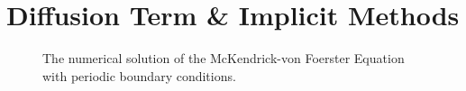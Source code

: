 \documentclass[../main.tex]{subfiles}
\begin{document}
  \section{Diffusion Term \& Implicit Methods}

  \begin{figure}[htb]
    \centering
    \caption{\label{method:fig:diffusionKChange} The numerical solution of the McKendrick-von Foerster Equation with periodic boundary conditions.}
  \end{figure}
\end{document}
